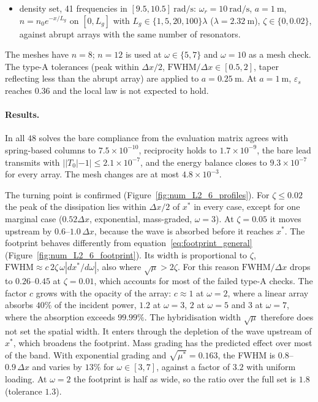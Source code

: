 {\begin{itemize}
    \item density set, 41 frequencies in $[9.5,10.5]~\si{\radian\per\second}$: $\omega_r=10~\si{\radian\per\second}$, $a=1~\si{\meter}$, $n=n_0e^{-x/L_g}$ on $[0,L_g]$ with $L_g\in\{1,5,20,100\}\lambda$ ($\lambda=2.32~\si{\meter}$), $\zeta\in\{0,0.02\}$, against abrupt arrays with the same number of resonators.
\end{itemize}
The meshes have $n=8$; $n=12$ is used at $\omega\in\{5,7\}$ and $\omega=10$ as a mesh check. The type-A tolerances (peak within $\Delta x/2$, $\mathrm{FWHM}/\Delta x\in[0.5,2]$, taper reflecting less than the abrupt array) are applied to $a=0.25~\si{\meter}$. At $a=1~\si{\meter}$, $\varepsilon_s$ reaches $0.36$ and the local law is not expected to hold.

\paragraph{Results.} In all $48$ solves the bare compliance from the evaluation matrix agrees with spring-based columns to $7.5\times10^{-10}$, reciprocity holds to $1.7\times10^{-9}$, the bare lead transmits with $||T_0|-1|\le2.1\times10^{-7}$, and the energy balance closes to $9.3\times10^{-7}$ for every array. The mesh changes are at most $4.8\times10^{-3}$.

The turning point is confirmed (Figure~\ref{fig:num_L2_6_profiles}). For $\zeta\le0.02$ the peak of the dissipation lies within $\Delta x/2$ of $x^*$ in every case, except for one marginal case ($0.52\Delta x$, exponential, mass-graded, $\omega=3$). At $\zeta=0.05$ it moves upstream by $0.6$--$1.0\,\Delta x$, because the wave is absorbed before it reaches $x^*$. The footprint behaves differently from equation~\eqref{eq:footprint_general} (Figure~\ref{fig:num_L2_6_footprint}). Its width is proportional to $\zeta$, $\mathrm{FWHM}\approx c\,2\zeta\,\omega|dx^*/d\omega|$, also where $\sqrt{\mu}>2\zeta$. For this reason $\mathrm{FWHM}/\Delta x$ drops to $0.26$--$0.45$ at $\zeta=0.01$, which accounts for most of the failed type-A checks. The factor $c$ grows with the opacity of the array: $c\approx1$ at $\omega=2$, where a linear array absorbs $40\%$ of the incident power, $1.2$ at $\omega=3$, $2$ at $\omega=5$ and $3$ at $\omega=7$, where the absorption exceeds $99.99\%$. The hybridisation width $\sqrt{\mu}$ therefore does not set the spatial width. It enters through the depletion of the wave upstream of $x^*$, which broadens the footprint. Mass grading has the predicted effect over most of the band. With exponential grading and $\sqrt{\mu^*}=0.163$, the FWHM is $0.8$--$0.9\,\Delta x$ and varies by $13\%$ for $\omega\in[3,7]$, against a factor of $3.2$ with uniform loading. At $\omega=2$ the footprint is half as wide, so the ratio over the full set is $1.8$ (tolerance $1.3$).

}
